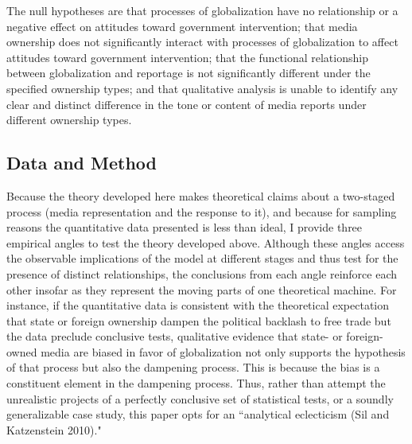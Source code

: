 \documentclass[a4paper]{article}
\begin{document}
The null hypotheses are that processes of globalization have no relationship or a negative effect on attitudes toward government intervention; that media ownership does not significantly interact with processes of globalization to affect attitudes toward government intervention; that the functional relationship between globalization and reportage is not significantly different under the specified ownership types; and that qualitative analysis is unable to identify any clear and distinct difference in the tone or content of media reports under different ownership types.
\subsection{Data and Method}

Because the theory developed here makes theoretical claims about a two-staged process (media representation and the response to it), and because for sampling reasons the quantitative data presented is less than ideal, I provide three empirical angles to test the theory developed above. Although these angles access the observable implications of the model at different stages and thus test for the presence of distinct relationships, the conclusions from each angle reinforce each other insofar as they represent the moving parts of one theoretical machine. For instance, if the quantitative data is consistent with the theoretical expectation that state or foreign ownership dampen the political backlash to free trade but the data preclude conclusive tests, qualitative evidence that state- or foreign-owned media are biased in favor of globalization not only supports the hypothesis of that process but also the dampening process. This is because the bias is a constituent element in the dampening process. Thus, rather than attempt the unrealistic projects of a perfectly conclusive set of statistical tests, or a soundly generalizable case study, this paper opts for an ``analytical eclecticism (Sil and Katzenstein 2010)."
\end{document}
